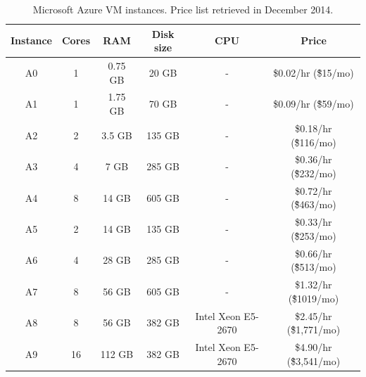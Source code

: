 \documentclass[3p,times]{elsarticle}
\begin{document}

	\begin{center}
	\begin{table}
				\begin{tabular}{|c|c|c|c|c|c|}
			\hline
			Instance & Cores & RAM     & Disk size & CPU & Price                    \\ \hline
				A0     & 1     & 0.75 GB & 20 GB      & - & \$0.02/hr (\~\$15/mo)    \\ \hline
				A1     & 1     & 1.75 GB & 70 GB      & - & \$0.09/hr (\~\$59/mo)    \\ \hline
				A2     & 2     & 3.5 GB  & 135 GB     & - & \$0.18/hr (\~\$116/mo)   \\ \hline
				A3     & 4     & 7 GB    & 285 GB     & - & \$0.36/hr (\~\$232/mo)   \\ \hline
				A4     & 8     & 14 GB   & 605 GB     & - & \$0.72/hr (\~\$463/mo)   \\ \hline
				A5     & 2     & 14 GB   & 135 GB     & - & \$0.33/hr (\~\$253/mo)   \\ \hline
				A6     & 4     & 28 GB   & 285 GB     & - & \$0.66/hr (\~\$513/mo)   \\ \hline
				A7     & 8     & 56 GB   & 605 GB     & - & \$1.32/hr (\~\$1019/mo)  \\ \hline
				A8     & 8     & 56 GB    & 382 GB    & Intel Xeon E5-2670 & \$2.45/hr (\~\$1,771/mo) \\ \hline
				A9     & 16    & 112 GB  & 382 GB     & Intel Xeon E5-2670 & \$4.90/hr (\~\$3,541/mo) \\ \hline
			\end{tabular}
			\label{tab:azureVMs}
			\caption{Microsoft Azure VM instances. Price list retrieved in December 2014.}
	\end{table}
\end{center}
 
\end{document}
